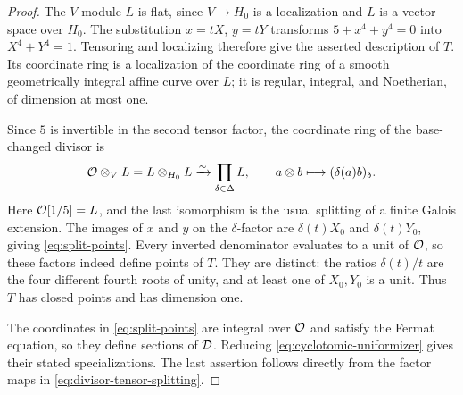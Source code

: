 \begin{proof}
The $V$-module $L$ is flat, since $V\to H_0$ is a localization and
$L$ is a vector space over $H_0$. The substitution $x=tX$, $y=tY$
transforms $5+x^4+y^4=0$ into $X^4+Y^4=1$. Tensoring and localizing
therefore give the asserted description of $T$. Its coordinate ring
is a localization of the coordinate ring of a smooth geometrically
integral affine curve over $L$; it is regular, integral, and
Noetherian, of dimension at most one.

Since $5$ is invertible in the second tensor factor, the coordinate
ring of the base-changed divisor is
\begin{equation}
\label{eq:divisor-tensor-splitting}
    \mathcal O\otimes_V L
      =L\otimes_{H_0}L
      \xrightarrow{\sim}\prod_{\delta\in\Delta}L,
    \qquad a\otimes b\longmapsto(\delta(a)b)_\delta.
\end{equation}
Here $\mathcal O[1/5]=L$, and the last isomorphism is the usual splitting
of a finite Galois extension. The images of $x$ and $y$ on the
$\delta$-factor are $\delta(t)X_0$ and $\delta(t)Y_0$, giving
\eqref{eq:split-points}. Every inverted denominator evaluates to a
unit of $\mathcal O$, so these factors indeed define points of $T$.
They are distinct: the ratios $\delta(t)/t$ are the four different
fourth roots of unity, and at least one of $X_0,Y_0$ is a unit.
Thus $T$ has closed points and has dimension one.

The coordinates in \eqref{eq:split-points} are integral over $\mathcal O$
and satisfy the Fermat equation, so they define sections of $\mathcal D$.
Reducing \eqref{eq:cyclotomic-uniformizer} gives their stated
specializations. The last assertion follows directly from the
factor maps in \eqref{eq:divisor-tensor-splitting}.
\end{proof}
